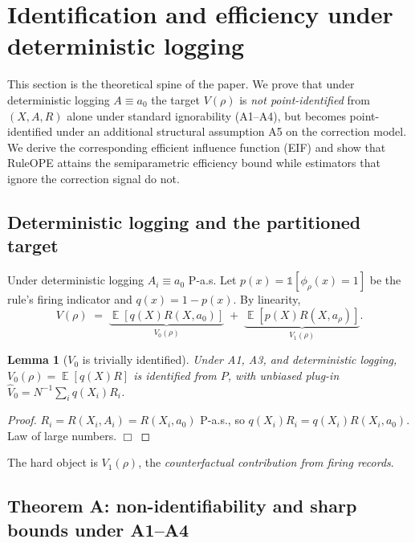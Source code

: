 \documentclass[11pt]{article}
\newtheorem{lemma}[theorem]{Lemma}
\DeclareMathOperator{\E}{\mathbb{E}}
\begin{document}
\section{Identification and efficiency under deterministic logging}
\label{sec:identification}

This section is the theoretical spine of the paper.  We prove that under
deterministic logging $A \equiv a_0$ the target $V(\rho)$ is
\emph{not point-identified} from $(X, A, R)$ alone under standard
ignorability (A1--A4), but becomes point-identified under an additional
structural assumption A5 on the correction model.  We derive the
corresponding efficient influence function (EIF) and show that RuleOPE
attains the semiparametric efficiency bound while estimators that ignore
the correction signal do not.

\subsection{Deterministic logging and the partitioned target}

Under deterministic logging $A_i \equiv a_0$ P-a.s.  Let
$p(x) = \mathbb{1}[\phi_\rho(x) = 1]$ be the rule's firing indicator and
$q(x) = 1 - p(x)$.  By linearity,
\begin{equation}
V(\rho) \;=\; \underbrace{\E[q(X) R(X, a_0)]}_{V_0(\rho)} \;+\; \underbrace{\E[p(X) R(X, a_\rho)]}_{V_1(\rho)}.
\label{eq:partition}
\end{equation}

\begin{lemma}[$V_0$ is trivially identified]
\label{lem:V0}
Under A1, A3, and deterministic logging, $V_0(\rho) = \E[q(X) R]$ is
identified from $P$, with unbiased plug-in $\widehat V_0 = N^{-1}\sum_i q(X_i) R_i$.
\end{lemma}
\begin{proof}
$R_i = R(X_i, A_i) = R(X_i, a_0)$ P-a.s., so $q(X_i) R_i = q(X_i) R(X_i, a_0)$.
Law of large numbers. $\Box$
\end{proof}

The hard object is $V_1(\rho)$, the \emph{counterfactual contribution
from firing records}.

\subsection{Theorem A: non-identifiability and sharp bounds under A1--A4}
\end{document}
